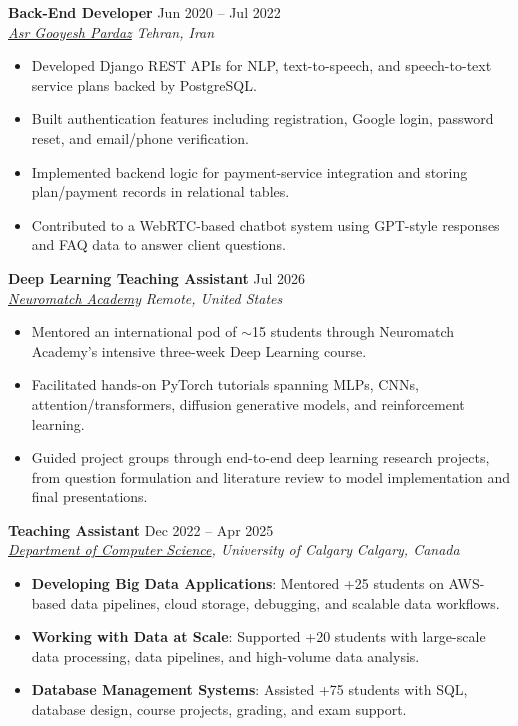 \documentclass[a4paper,10pt]{article}
\newcommand{\resumeSubheading}[4]{
    \textbf{#1} \hfill #2 \\
    \textit{#3} \hfill \textit{#4}
}
\begin{document}
\resumeSubheading
{Back-End Developer}
{Jun 2020 -- Jul 2022}
{\href{https://asr-gooyesh.com/en/}{Asr Gooyesh Pardaz}}
{Tehran, Iran}
\begin{itemize}[leftmargin=0.25in]
    \item Developed Django REST APIs for NLP, text-to-speech, and speech-to-text service plans backed by PostgreSQL.
    \item Built authentication features including registration, Google login, password reset, and email/phone verification.
    \item Implemented backend logic for payment-service integration and storing plan/payment records in relational tables.
    \item Contributed to a WebRTC-based chatbot system using GPT-style responses and FAQ data to answer client questions.
\end{itemize}

\resumeSubheading
{Deep Learning Teaching Assistant}
{Jul 2026}
{\href{https://neuromatch.io/}{Neuromatch Academy}}
{Remote, United States}
\begin{itemize}[leftmargin=0.25in]
    \item Mentored an international pod of $\sim$15 students through Neuromatch Academy's intensive three-week Deep Learning course.
    \item Facilitated hands-on PyTorch tutorials spanning MLPs, CNNs, attention/transformers, diffusion generative models, and reinforcement learning.
    \item Guided project groups through end-to-end deep learning research projects, from question formulation and literature review to model implementation and final presentations.
\end{itemize}

\resumeSubheading
{Teaching Assistant}
{Dec 2022 -- Apr 2025}
{\href{https://science.ucalgary.ca/computer-science} {Department of Computer Science}, University of Calgary}
{Calgary, Canada}
\begin{itemize}[leftmargin=0.25in]
    \item \textbf{Developing Big Data Applications}: Mentored +25 students on AWS-based data pipelines, cloud storage, debugging, and scalable data workflows.
    \item \textbf{Working with Data at Scale}: Supported +20 students with large-scale data processing, data pipelines, and high-volume data analysis.
    \item \textbf{Database Management Systems}: Assisted +75 students with SQL, database design, course projects, grading, and exam support.
\end{itemize}
\end{document}
